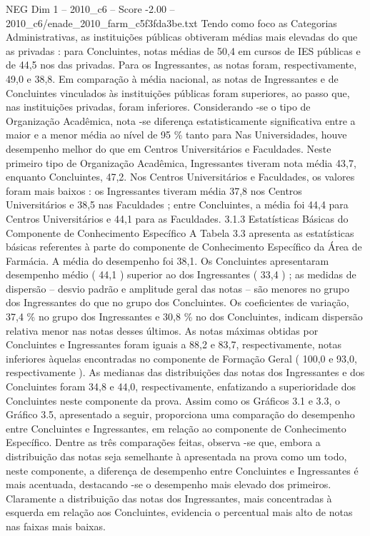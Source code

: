 \begin{textsample}{NEG Dim 1 – 2010\_c6 – Score -2.00 – 2010\_c6/enade\_2010\_farm\_c5f3fda3be.txt}
Tendo como foco as Categorias Administrativas, as instituições públicas obtiveram médias mais elevadas do que as privadas : para Concluintes, notas médias de 50,4 em cursos de IES públicas e de 44,5 nos das privadas.
Para os Ingressantes, as notas foram, respectivamente, 49,0 e 38,8.
Em comparação à média nacional, as notas de Ingressantes e de Concluintes vinculados às instituições públicas foram superiores, ao passo que, nas instituições privadas, foram inferiores.
Considerando -se o tipo de Organização Acadêmica, nota -se diferença estatisticamente significativa entre a maior e a menor média ao nível de 95 \% tanto para Nas Universidades, houve desempenho melhor do que em Centros Universitários e Faculdades.
Neste primeiro tipo de Organização Acadêmica, Ingressantes tiveram nota média 43,7, enquanto Concluintes, 47,2.
Nos Centros Universitários e Faculdades, os valores foram mais baixos : os Ingressantes tiveram média 37,8 nos Centros Universitários e 38,5 nas Faculdades ; entre Concluintes, a média foi 44,4 para Centros Universitários e 44,1 para as Faculdades. 3.1.3 Estatísticas Básicas do Componente de Conhecimento Específico A Tabela 3.3 apresenta as estatísticas básicas referentes à parte do componente de Conhecimento Específico da Área de Farmácia.
A média do desempenho foi 38,1.
Os Concluintes apresentaram desempenho médio ( 44,1 ) superior ao dos Ingressantes ( 33,4 ) ; as medidas de dispersão – desvio padrão e amplitude geral das notas – são menores no grupo dos Ingressantes do que no grupo dos Concluintes.
Os coeficientes de variação, 37,4 \% no grupo dos Ingressantes e 30,8 \% no dos Concluintes, indicam dispersão relativa menor nas notas desses últimos.
As notas máximas obtidas por Concluintes e Ingressantes foram iguais a 88,2 e 83,7, respectivamente, notas inferiores àquelas encontradas no componente de Formação Geral ( 100,0 e 93,0, respectivamente ).
As medianas das distribuições das notas dos Ingressantes e dos Concluintes foram 34,8 e 44,0, respectivamente, enfatizando a superioridade dos Concluintes neste componente da prova.
Assim como os Gráficos 3.1 e 3.3, o Gráfico 3.5, apresentado a seguir, proporciona uma comparação do desempenho entre Concluintes e Ingressantes, em relação ao componente de Conhecimento Específico.
Dentre as três comparações feitas, observa -se que, embora a distribuição das notas seja semelhante à apresentada na prova como um todo, neste componente, a diferença de desempenho entre Concluintes e Ingressantes é mais acentuada, destacando -se o desempenho mais elevado dos primeiros.
Claramente a distribuição das notas dos Ingressantes, mais concentradas à esquerda em relação aos Concluintes, evidencia o percentual mais alto de notas nas faixas mais baixas.

\end{textsample}
